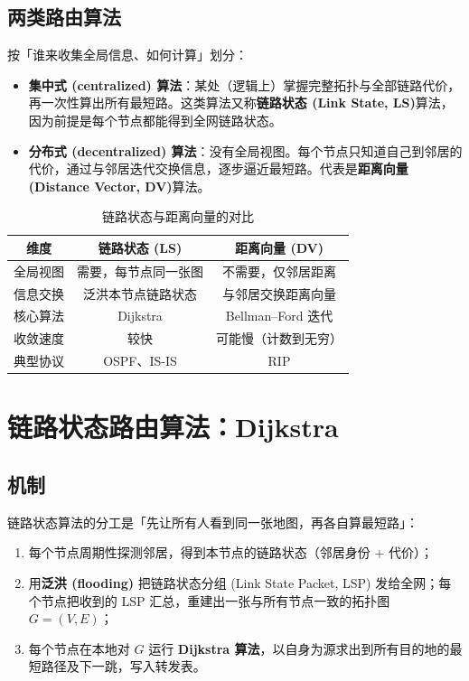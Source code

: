 \subsection{两类路由算法}

按「谁来收集全局信息、如何计算」划分：

\begin{itemize}
    \item \textbf{集中式 (centralized) 算法}：某处（逻辑上）掌握完整拓扑与全部链路代价，再一次性算出所有最短路。这类算法又称\textbf{链路状态 (Link State, LS)}算法，因为前提是每个节点都能得到全网链路状态。
    \item \textbf{分布式 (decentralized) 算法}：没有全局视图。每个节点只知道自己到邻居的代价，通过与邻居迭代交换信息，逐步逼近最短路。代表是\textbf{距离向量 (Distance Vector, DV)}算法。
\end{itemize}

\begin{table}[H]
\centering
\caption{链路状态与距离向量的对比}
\renewcommand{\arraystretch}{1.4}
\begin{tabulary}{\textwidth}{@{}CCC@{}}
\toprule
\textbf{维度} & \textbf{链路状态 (LS)} & \textbf{距离向量 (DV)} \\
\midrule
全局视图 & 需要，每节点同一张图 & 不需要，仅邻居距离 \\
信息交换 & 泛洪本节点链路状态 & 与邻居交换距离向量 \\
核心算法 & Dijkstra & Bellman--Ford 迭代 \\
收敛速度 & 较快 & 可能慢（计数到无穷） \\
典型协议 & OSPF、IS-IS & RIP \\
\bottomrule
\end{tabulary}
\end{table}

\section{链路状态路由算法：Dijkstra}

\subsection{机制}

链路状态算法的分工是「先让所有人看到同一张地图，再各自算最短路」：

\begin{enumerate}
    \item 每个节点周期性探测邻居，得到本节点的链路状态（邻居身份 + 代价）；
    \item 用\textbf{泛洪 (flooding)} 把链路状态分组 (Link State Packet, LSP) 发给全网；每个节点把收到的 LSP 汇总，重建出一张与所有节点一致的拓扑图 $G=(V,E)$；
    \item 每个节点在本地对 $G$ 运行 \textbf{Dijkstra 算法}，以自身为源求出到所有目的地的最短路径及下一跳，写入转发表。
\end{enumerate}

